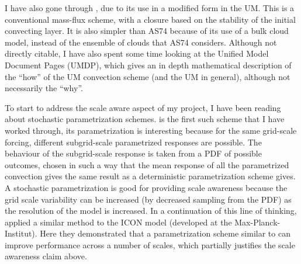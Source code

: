 \documentclass[11pt,a4paper]{article}
\begin{document}
I have also gone through \cite{gregory1990mass}, due to its use in a modified form in the UM. 
This is a conventional mass-flux scheme, with a closure based on the stability of the initial
convecting layer. It is also simpler than AS74
because of its use of a bulk cloud model, instead of the ensemble of clouds that AS74 considers.
Although not directly citable, I have also spent some time looking at the Unified Model Document
Pages (UMDP), which gives an in depth mathematical description of the ``how'' of the UM convection
scheme (and the UM in general), although not necessarily the ``why''.

To start to address the scale aware aspect of my project, I have been reading about stochastic
parametrization schemes. \cite{plant2008stochastic} is the first such scheme that I have worked
through, its parametrization is interesting because for the same grid-scale forcing, different
subgrid-scale parametrized responses are possible. The behaviour of the subgrid-scale response is
taken from a PDF of possible outcomes, chosen in such a way that the mean response of all the
parametrized convection gives the same result as a deterministic parametrization scheme gives. A
stochastic parametrization is good for providing scale awareness because the grid scale variability
can be increased (by decreased sampling from the PDF) as the resolution of the model is increased.
In a continuation of this line of thinking, \cite{sakradzija2016stochastic} applied a similar method
to the ICON model (developed at the Max-Planck-Institut). Here they demonstrated that a
parametrization scheme similar to \cite{plant2008stochastic} can improve performance across a number
of scales, which partially justifies the scale awareness claim above.
\end{document}
